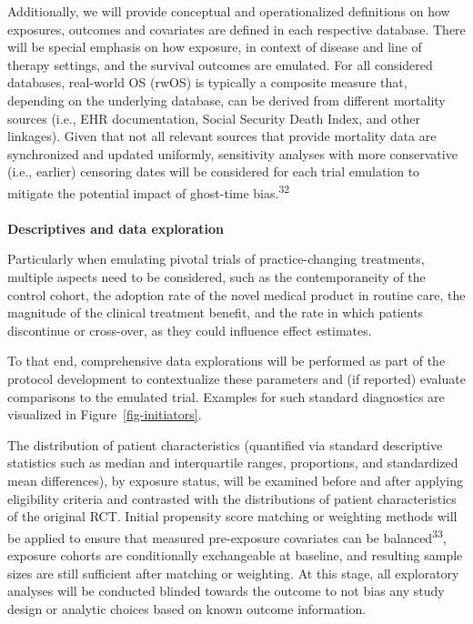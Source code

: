 \documentclass[
  letterpaper,
  DIV=11,
  numbers=noendperiod]{scrartcl}
\makeatletter
\let\oldparagraph\paragraph
\renewcommand{\paragraph}{
    \@ifstar
      \xxxParagraphStar
      \xxxParagraphNoStar
  }
\newcommand{\xxxParagraphStar}[1]{\oldparagraph*{#1}\mbox{}}
\newcommand{\xxxParagraphNoStar}[1]{\oldparagraph{#1}\mbox{}}
\makeatother
\begin{document}
Additionally, we will provide conceptual and operationalized definitions
on how exposures, outcomes and covariates are defined in each respective
database. There will be special emphasis on how exposure, in context of
disease and line of therapy settings, and the survival outcomes are
emulated. For all considered databases, real-world OS (rwOS) is
typically a composite measure that, depending on the underlying
database, can be derived from different mortality sources (i.e., EHR
documentation, Social Security Death Index, and other linkages). Given
that not all relevant sources that provide mortality data are
synchronized and updated uniformly, sensitivity analyses with more
conservative (i.e., earlier) censoring dates will be considered for each
trial emulation to mitigate the potential impact of ghost-time
bias.\textsuperscript{32}

\paragraph{\texorpdfstring{\textbf{Descriptives and data
exploration}}{Descriptives and data exploration}}\label{descriptives-and-data-exploration}

Particularly when emulating pivotal trials of practice-changing
treatments, multiple aspects need to be considered, such as the
contemporaneity of the control cohort, the adoption rate of the novel
medical product in routine care, the magnitude of the clinical treatment
benefit, and the rate in which patients discontinue or cross-over, as
they could influence effect estimates.

To that end, comprehensive data explorations will be performed as part
of the protocol development to contextualize these parameters and (if
reported) evaluate comparisons to the emulated trial. Examples for such
standard diagnostics are visualized in Figure~\ref{fig-initiators}.

The distribution of patient characteristics (quantified via standard
descriptive statistics such as median and interquartile ranges,
proportions, and standardized mean differences), by exposure status,
will be examined before and after applying eligibility criteria and
contrasted with the distributions of patient characteristics of the
original RCT. Initial propensity score matching or weighting methods
will be applied to ensure that measured pre-exposure covariates can be
balanced\textsuperscript{33}, exposure cohorts are conditionally
exchangeable at baseline, and resulting sample sizes are still
sufficient after matching or weighting. At this stage, all exploratory
analyses will be conducted blinded towards the outcome to not bias any
study design or analytic choices based on known outcome information.
\end{document}
